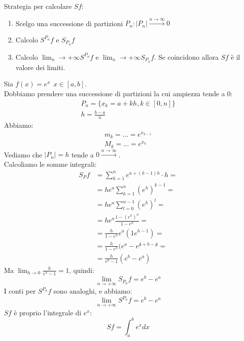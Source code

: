 Strategia per calcolare $Sf$:
\begin{enumerate}
    \item Scelgo una successione di partizioni $P_n:|P_n|\xrightarrow{n\to\infty}0$
    \item Calcolo $S^{P_n}f$ e $S _{P_n}f$
    \item Calcolo $\lim_{n}\to{+\infty}S^{P_n}f$ e $\lim_{n}\to{+\infty}S _{P_n}f$. Se coincidono allora $Sf$ è il valore dei limiti.
\end{enumerate}
\begin{esempio}
    Sia $f(x)=e^x\ \ x\in[a,b]$. \\
    Dobbiamo prendere una successione di partizioni la cui ampiezza tende a 0:
    \begin{gather}
        P_n=\{x_k=a+kh, k\in[0,n]\} \\
        h= \frac{b-a}{n}
    \end{gather}
    Abbiamo:
    \begin{gather}
        m_k=...=e^{x_{k-1}} \\
        M_k=...=e^{x_k}
    \end{gather}
    Vediamo che $|P_n|=h$ tende a $0\xrightarrow{n\to\infty}$. \\
    Calcoliamo le somme integrali:
    \begin{align}
        S_Pf &=\sum_{k=1}^{n}e^{a+(k-1)h}\cdot h = \\
             &=he^a \sum_{k=1}^{n}(e^h)^{k-1} = \\
             &=he^a \sum_{l=0}^{n-1}(e^h)^l = \\
             &=he^a \frac{1-(e^h)^n}{1-e^h} = \\
             &=\frac{h}{1-e^h}e^a(1e^{h-1}) = \\
             &=\frac{h}{1-e^h}(e^a-e^{\not a+b-\not a}= \\
             &=\frac{h}{e^h-1}(e^b-e^a)
    \end{align}
    Ma $\lim_{h\to0}\frac{h}{e^h-1}=1$, quindi:
    \begin{equation}
        \lim_{n\to+\infty}S_{P_n}f=e^b-e^a
    \end{equation}
    I conti per $S^{P_n}f$ sono analoghi, e abbiamo:
    \begin{equation}
        \lim_{n\to+\infty}S^{P_n}f=e^b-e^a
    \end{equation}
    $Sf$ è proprio l'integrale di $e^x$:
    \begin{equation}
        Sf= \int_{a}^{b}e^x dx
    \end{equation}
\end{esempio}


